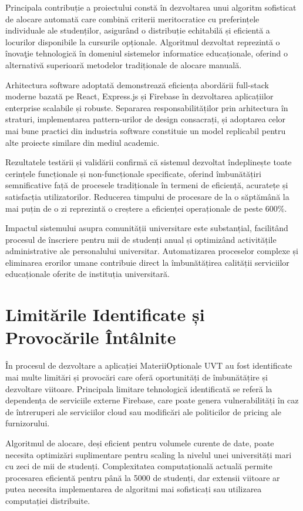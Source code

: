 \documentclass[12pt,a4paper]{report}
\begin{document}
Principala contribuție a proiectului constă în dezvoltarea unui algoritm sofisticat de alocare automată care combină criterii meritocratice cu preferințele individuale ale studenților, asigurând o distribuție echitabilă și eficientă a locurilor disponibile la cursurile opționale. Algoritmul dezvoltat reprezintă o înovaţie tehnologică în domeniul sistemelor informatice educaționale, oferind o alternativă superioară metodelor tradiționale de alocare manuală.

Arhitectura software adoptată demonstrează eficiența abordării full-stack moderne bazată pe React, Express.js și Firebase în dezvoltarea aplicațiilor enterprise scalabile și robuste. Separarea responsabilităților prin arhitectura în straturi, implementarea pattern-urilor de design consacrați, și adoptarea celor mai bune practici din industria software constituie un model replicabil pentru alte proiecte similare din mediul academic.

Rezultatele testării și validării confirmă că sistemul dezvoltat îndeplinește toate cerințele funcționale și non-funcționale specificate, oferind îmbunătățiri semnificative față de procesele tradiționale în termeni de eficiență, acuratețe și satisfacția utilizatorilor. Reducerea timpului de procesare de la o săptămână la mai puțin de o zi reprezintă o creștere a eficienței operaționale de peste 600\%.

Impactul sistemului asupra comunității universitare este substanțial, facilitând procesul de înscriere pentru mii de studenți anual și optimizând activitățile administrative ale personalului universitar. Automatizarea proceselor complexe și eliminarea erorilor umane contribuie direct la îmbunătățirea calității serviciilor educaționale oferite de instituția universitară.

\section{Limitările Identificate și Provocările Întâlnite}

În procesul de dezvoltare a aplicației MateriiOptionale UVT au fost identificate mai multe limitări și provocări care oferă oportunități de îmbunătățire și dezvoltare viitoare. Principala limitare tehnologică identificată se referă la dependența de serviciile externe Firebase, care poate genera vulnerabilități în caz de întreruperi ale serviciilor cloud sau modificări ale politicilor de pricing ale furnizorului.

Algoritmul de alocare, deși eficient pentru volumele curente de date, poate necesita optimizări suplimentare pentru scaling la nivelul unei universități mari cu zeci de mii de studenți. Complexitatea computațională actuală permite procesarea eficientă pentru până la 5000 de studenți, dar extensii viitoare ar putea necesita implementarea de algoritmi mai sofisticați sau utilizarea computației distribuite.
\end{document}
